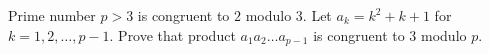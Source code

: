 Prime number $p>3$ is congruent to $2$ modulo $3$. Let $a_k = k^2 + k +1$ for $k=1, 2, \ldots, p-1$. Prove that product $a_1a_2\ldots a_{p-1}$ is congruent to $3$ modulo $p$.